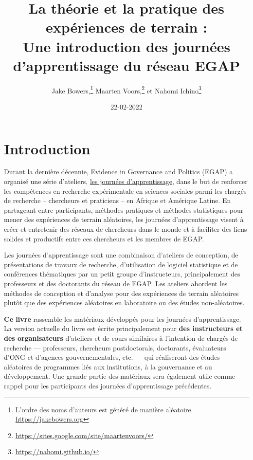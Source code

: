\documentclass[
  12pt,
]{book}
\title{La théorie et la pratique des expériences de terrain :\\
Une introduction des journées d'apprentissage du réseau EGAP}
\author{Jake Bowers,\footnote{L'ordre des noms d'auteurs est généré de manière aléatoire. \url{https://jakebowers.org}} Maarten Voors,\footnote{\url{https://sites.google.com/site/maartenvoors/}} et Nahomi Ichino\footnote{\url{https://nahomi.github.io/}}}
\date{22-02-2022}
\begin{document}
\maketitle

\captionsetup[table]{list=no}
\captionsetup[figure]{list=no}

{
\hypersetup{linkcolor=}
\setcounter{tocdepth}{1}
\tableofcontents
}
\hypertarget{introduction}{%
\chapter{Introduction}\label{introduction}}

Durant la dernière décennie, \href{https://egap.org/}{Evidence in Governance and Politics (EGAP)} a organisé une série d'ateliers, \href{https://egap.org/learning-days/}{les journées d'apprentissage}, dans le but de renforcer les compétences en recherche expérimentale en sciences sociales parmi les chargés de recherche -- chercheurs et praticiens -- en Afrique et Amérique Latine. En partageant entre participants, méthodes pratiques et méthodes statistiques pour mener des expériences de terrain aléatoires, les journées d'apprentissage visent à créer et entretenir des réseaux de chercheurs dans le monde et à faciliter des liens solides et productifs entre ces chercheurs et les membres de EGAP.

Les journées d'apprentissage sont une combinaison d'ateliers de conception, de présentations de travaux de recherche, d'utilisation de logiciel statistique et de conférences thématiques par un petit groupe d'instructeurs, principalement des professeurs et des doctorants du réseau de EGAP. Les ateliers abordent les méthodes de conception et d'analyse pour des expériences de terrain aléatoires plutôt que des expériences aléatoires en laboratoire ou des études non-aléatoires.

\textbf{Ce livre} rassemble les matériaux développés pour les journées d'apprentissage. La version actuelle du livre est écrite principalement pour \textbf{des instructeurs et des organisateurs} d'ateliers et de cours similaires à l'intention de chargés de recherche --- professeurs, chercheurs postdoctorals, doctorants, évaluateurs d'ONG et d'agences gouvernementales, etc. --- qui réaliseront des études aléatoires de programmes liés aux institutions, à la gouvernance et au développement. Une grande partie des matériaux sera également utile comme rappel pour les participants des journées d'apprentissage précédentes.
\end{document}

